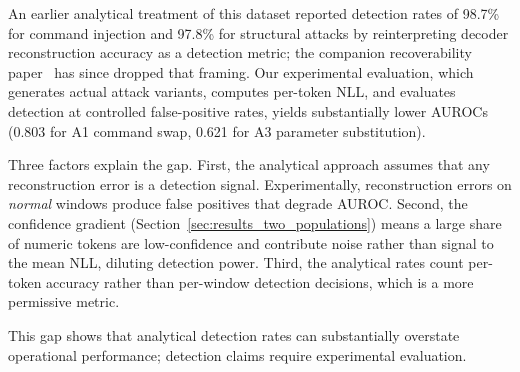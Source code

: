 An earlier analytical treatment of this dataset reported detection rates of 98.7\% for command injection and 97.8\% for structural attacks by reinterpreting decoder reconstruction accuracy as a detection metric; the companion recoverability paper~\cite{eacuello2026decoder} has since dropped that framing.
Our experimental evaluation, which generates actual attack variants, computes per-token NLL, and evaluates detection at controlled false-positive rates, yields substantially lower AUROCs (0.803 for A1 command swap, 0.621 for A3 parameter substitution).

Three factors explain the gap.
First, the analytical approach assumes that any reconstruction error is a detection signal.
Experimentally, reconstruction errors on \emph{normal} windows produce false positives that degrade AUROC.
Second, the confidence gradient (Section~\ref{sec:results_two_populations}) means a large share of numeric tokens are low-confidence and contribute noise rather than signal to the mean NLL, diluting detection power.
Third, the analytical rates count per-token accuracy rather than per-window detection decisions, which is a more permissive metric.

This gap shows that analytical detection rates can substantially overstate operational performance; detection claims require experimental evaluation.
